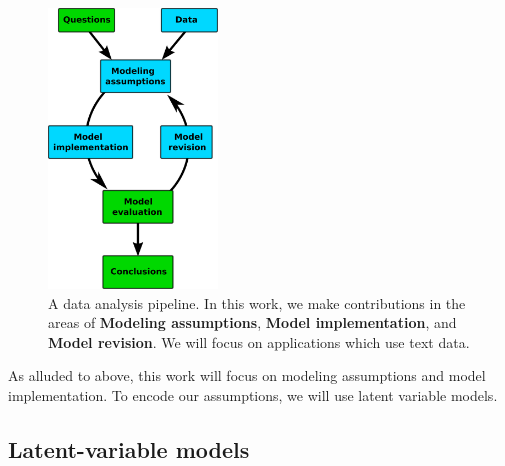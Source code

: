 \begin{figure}
  \center \includegraphics[width=0.4\textwidth]{chapter_introductory_material/figs/model_pipeline.pdf}
  \caption{A data analysis pipeline.  In this work, we make
    contributions in the areas of \textbf{Modeling assumptions},
    \textbf{Model implementation}, and \textbf{Model revision}.  We
    will focus on applications which use text data.}
  \label{fig:data_analysis_pipeline}
\end{figure}

As alluded to above, this work will focus on modeling assumptions and
model implementation.  To encode our assumptions, we will use latent
variable models.

\subsection{Latent-variable models}

